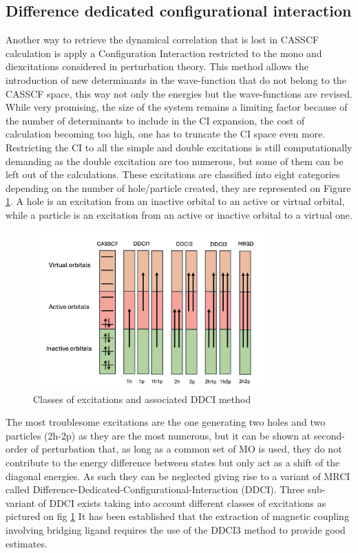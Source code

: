 \documentclass[12pt]{report}
\numberwithin{equation}{section}
\begin{document}
\subsection{Difference dedicated configurational interaction}
Another way to retrieve the dynamical correlation that is lost in CASSCF calculation is apply a Configuration Interaction restricted to the mono and diexcitations considered in perturbation theory.
This method allows the introduction of new determinants in the wave-function that do not belong to the CASSCF space, this way not only the energies but the wave-functions are revised.
While very promising, the size of the system remains a limiting factor because of the number of determinants to include in the CI expansion, the cost of calculation becoming too high, one has to truncate the CI space even more.
Restricting the CI to all the simple and double excitations is still computationally demanding as the double excitation are too numerous, but some of them can be left out of the calculations. 
These excitations are classified into eight categories depending on the number of hole/particle created, they are represented on Figure \ref{DDCI}. 
A hole is an excitation from an inactive orbital to an active or virtual orbital, while a particle is an excitation from an active or inactive orbital to a virtual one.

\begin{figure}
    \centering
    \includegraphics[width=0.8\textwidth]{Images/DDCI.png}
    \caption{Classes of excitations and associated DDCI method}
    \label{DDCI}
\end{figure}
The most troublesome excitations are the one generating two holes and two particles (2h-2p) as they are the most numerous, but it can be shown at second-order of perturbation that, as long as a common set of MO is used, they do not contribute to the energy difference between states but only act as a shift of the diagonal energies.
As such they can be neglected giving rise to a variant of MRCI called Difference-Dedicated-Configurational-Interaction (DDCI). 
Three sub-variant of DDCI exists taking into account different classes of excitations as pictured on fig \ref{DDCI}
It has been established that the extraction of magnetic coupling involving bridging ligand requires the use of the DDCI3 method to provide good estimates.
\end{document}
